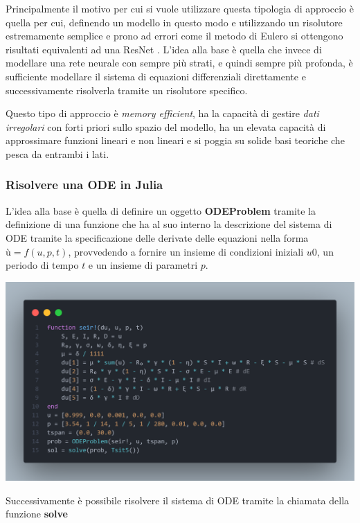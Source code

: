 Principalmente il motivo per cui si vuole utilizzare questa tipologia di approccio 
è quella per cui, definendo un modello in questo modo e utilizzando un risolutore
estremamente semplice e prono ad errori come il metodo di Eulero 
si ottengono risultati equivalenti ad una ResNet \cite{he2015deep}. L'idea alla base
è quella che invece di modellare una rete neurale con sempre più strati, e quindi 
sempre più profonda, è sufficiente modellare il sistema di equazioni differenziali
direttamente e successivamente risolverla tramite un risolutore specifico.

Questo tipo di approccio è \emph{memory efficient}, ha la capacità di gestire
\emph{dati irregolari} con forti priori sullo spazio del modello, ha un elevata
capacità di approssimare funzioni lineari e non lineari e si poggia su solide basi 
teoriche che pesca da entrambi i lati.

\subsubsection*{Risolvere una ODE in Julia}
L'idea alla base è quella di definire un oggetto \textbf{ODEProblem} tramite la 
definizione di una funzione che ha al suo interno la descrizione del sistema di ODE 
tramite la specificazione delle derivate delle equazioni nella forma $ù = f(u, p, t)$,
provvedendo a fornire un insieme di condizioni iniziali $u0$, un periodo di tempo $t$
e un insieme di parametri $p$.

\begin{minipage}{\linewidth}
    \centering
    \includegraphics[width=\textwidth]{img/fdefinition.png}
    \label{fig:ODE_Julia_example}
\end{minipage}

Successivamente è possibile risolvere il sistema di ODE tramite la chiamata
della funzione \textbf{solve}

